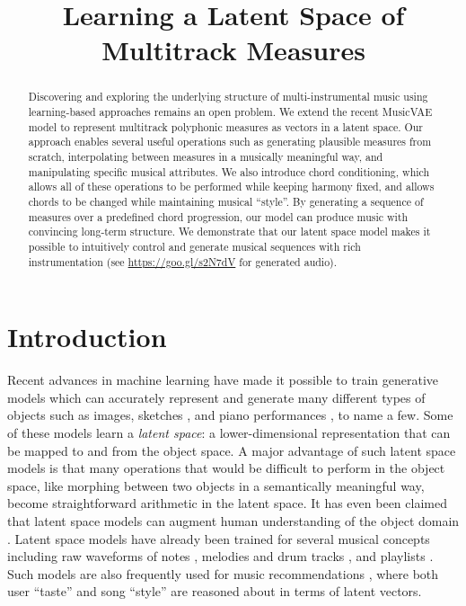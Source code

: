 \documentclass{article}
\title{Learning a Latent Space of Multitrack Measures}
\begin{document}
%
\maketitle
%
\begin{abstract}
Discovering and exploring the underlying structure of multi-instrumental music using learning-based approaches remains an open problem.  We extend the recent MusicVAE model  \cite{roberts2018hierarchical} to represent multitrack polyphonic measures as vectors in a latent space.  Our approach enables several useful operations such as generating plausible measures from scratch, interpolating between measures in a musically meaningful way, and manipulating specific musical attributes.  We also introduce chord conditioning, which allows all of these operations to be performed while keeping harmony fixed, and allows chords to be changed while maintaining musical ``style''.  By generating a sequence of measures over a predefined chord progression, our model can produce music with convincing long-term structure.  We demonstrate that our latent space model makes it possible to intuitively control and generate musical sequences with rich instrumentation (see \url{https://goo.gl/s2N7dV} for generated audio).
\end{abstract}
%

\section{Introduction}
\label{sec:introduction}

Recent advances in machine learning have made it possible to train generative models which can accurately represent and generate many different types of objects such as images, sketches \cite{ha2017neural}, and piano performances \cite{performance-rnn-2017}, to name a few.  Some of these models learn a {\it latent space}: a lower-dimensional representation that can be mapped to and from the object space.  A major advantage of such latent space models is that many operations that would be difficult to perform in the object space, like morphing between two objects in a semantically meaningful way, become straightforward arithmetic in the latent space. It has even been claimed that latent space models can augment human understanding of the object domain \cite{carter2017using}.  Latent space models have already been trained for several musical concepts including raw waveforms of notes \cite{engel2017neural}, melodies and drum tracks \cite{roberts2018hierarchical}, and playlists \cite{latent-playlists}.  Such models are also frequently used for music recommendations \cite{koren2009matrix}, where both user ``taste'' and song ``style'' are reasoned about in terms of latent vectors.
\end{document}
